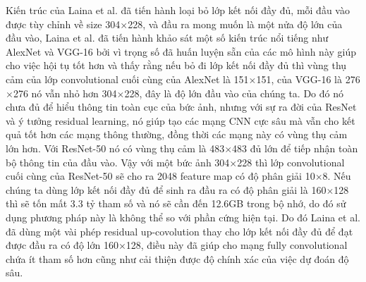 Kiến trúc của Laina et al.\cite{laina2016deeper} đã tiến hành loại bỏ lớp kết nối đầy đủ, mỗi đầu vào được tùy chỉnh về size 304$\times$228, và đầu ra mong muốn là một nửa độ lớn của đầu vào, Laina et al.\cite{laina2016deeper} đã tiến hành khảo sát một số kiến trúc nổi tiếng như AlexNet\cite{Krizhevsky2012} và VGG-16\cite{Simonyan2014} bởi vì trọng số đã huấn luyện sẵn của các mô hình này giúp cho việc hội tụ tốt hơn và thấy rằng nếu bỏ đi lớp kết nối đầy đủ thì vùng thụ cảm của lớp convolutional cuối cùng của AlexNet là 151$\times$151, của VGG-16 là 276$\times$276 nó vẫn nhỏ hơn 304$\times$228, đây là độ lớn đầu vào của chúng ta. Do đó nó chưa đủ để hiểu thông tin toàn cục của bức ảnh, nhưng với sự ra đời của ResNet\cite{KHe2015} và ý tưởng residual learning, nó giúp tạo các mạng CNN cực sâu mà vẫn cho kết quả tốt hơn các mạng thông thường, đồng thời các mạng này có vùng thụ cảm lớn hơn. Với ResNet-50 nó có vùng thụ cảm là 483$\times$483 đủ lớn để tiếp nhận toàn bộ thông tin của đầu vào. Vậy với một bức ảnh 304$\times$228 thì lớp convolutional cuối cùng của  ResNet-50 sẽ cho ra 2048 feature map có độ phân giải 10$\times$8.  Nếu chúng ta dùng lớp kết nối đầy đủ để sinh ra đầu ra có độ phân giải là 160$\times$128 thì sẽ tốn mất 3.3 tỷ tham số và nó sẽ cần đến 12.6GB trong bộ nhớ, do đó sử dụng phương pháp này là không thể so  với phần cứng hiện tại. Do đó Laina et al.\cite{laina2016deeper} đã dùng một vài phép residual up-covolution thay cho lớp kết nối đầy đủ để đạt được đầu ra có độ lớn 160$\times$128, điều này đã giúp cho mạng fully convolutional chứa ít tham số hơn cũng như cải thiện được độ chính xác của việc dự đoán độ sâu.\\

